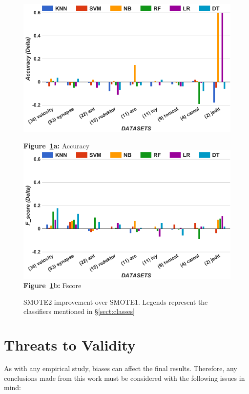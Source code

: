 \documentclass[sigconf,review, anonymous]{acmart}
\theoremstyle{break}
\theoremstyle{break}
\newcommand{\tion}[1]{{\S}\ref{sect:#1}}
\begin{document}


\begin{figure}[!htbp]
\begin{minipage}{\linewidth}
\centering
        \includegraphics[width=.95\linewidth]{./fig/acc_tuned.png}
        
  {\bf Figure~\ref{fig:threats}a:} Accuracy
        \includegraphics[width=.95\linewidth]{./fig/f_tuned.png}
  {\bf Figure~\ref{fig:threats}b:} Fscore
    \end{minipage}%
    \caption{SMOTE2 improvement over SMOTE1. Legends represent the classifiers mentioned in \tion{classes}}
    \label{fig:threats}
\end{figure}

\section{Threats to Validity}
\label{sect:validity}

As with any empirical study, biases can affect the final
results. Therefore, any conclusions made from this work must be considered with the following issues in mind:
\end{document}
